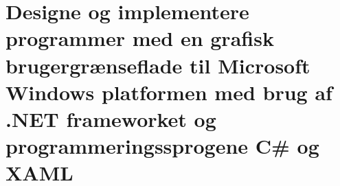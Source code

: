\section{Designe og implementere programmer med en grafisk brugergrænseflade til Microsoft Windows platformen med brug af .NET frameworket og programmeringssprogene C\# og XAML}\label{sec:spm2}


